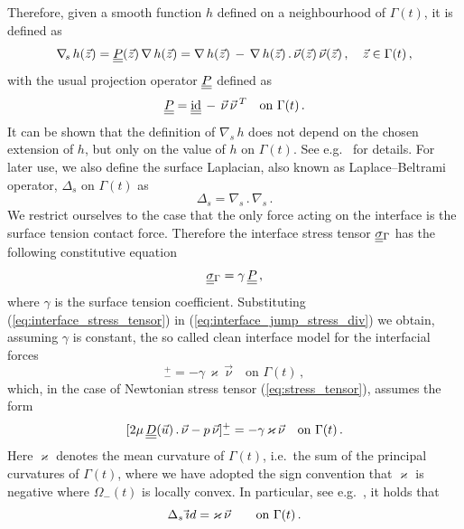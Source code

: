 \documentclass[a4paper,12pt,onecolumn]{article}
\newcommand{\nabs}{\nabla_{\!s}}
\newcommand{\id}{\rm id}
\newcommand{\mat}[1]{\underline{\underline{#1}}\rule{0pt}{0pt}}
\begin{document}
Therefore, given a smooth function $h$ defined on a neighbourhood of
$\Gamma(t)$, it is defined as
\begin{equation}\label{eq:surface_gradient}
\nabs\,h(\vec z)=\mat P(\vec z)\,\nabla\,h(\vec z)=\nabla\,h(\vec z)\,-
\,\nabla\,h(\vec z)\,.\,\vec\nu(\vec z)\,\vec\nu(\vec z)\,,\quad \vec z
\in\Gamma(t)\,,
\end{equation}
with the usual projection operator $\mat P$ defined as
\begin{equation}\label{eq:surface_projection}
\mat P=\mat\id\,-\,\vec\nu\,\vec\nu\,^T\quad \mbox{on } \Gamma(t)\,.
\end{equation}
It can be shown that the definition of $\nabs\,h$ does not depend on the chosen
extension of $h$, but only on the value of $h$ on $\Gamma(t)$. See e.g.\
\cite[\S2.1]{DeckelnickDE05} for details.
For later use, we also define the surface
Laplacian, also known as Laplace--Beltrami operator, $\Delta_s$ on $\Gamma(t)$
as
\begin{equation}\label{eq:surface_laplacian}
\Delta_s = \nabs\,.\,\nabs\,.
\end{equation}
We restrict ourselves to the case that the only force acting on the interface
is the surface tension contact force. Therefore the interface stress tensor
$\mat\sigma_\Gamma$ has the following constitutive equation
\begin{equation}\label{eq:interface_stress_tensor}
\mat\sigma_{\Gamma}=\gamma\,\mat P\,,
\end{equation}
where $\gamma$ is the surface tension coefficient. Substituting
(\ref{eq:interface_stress_tensor}) in (\ref{eq:interface_jump_stress_div}) we
obtain, assuming $\gamma$ is constant, the so called clean interface model for
the interfacial forces
\begin{equation}
[\mat\sigma\,\vec \nu]_-^+ = -\gamma\,\varkappa\,\vec\nu \quad \mbox{on }
\Gamma(t)\,,
\end{equation}
which, in the case of Newtonian stress tensor (\ref{eq:stress_tensor}), assumes
the form
\begin{equation}\label{eq:interface_jump_stress}
[2\mu \,\mat D(\vec u)\,.\,\vec\nu - p\,\vec \nu]_-^+
= -\gamma\,\varkappa\,\vec\nu \quad \mbox{on } \Gamma(t)\,.
\end{equation}
Here $\varkappa$ denotes the mean curvature of $\Gamma(t)$, i.e.\ the sum of
the principal curvatures of $\Gamma(t)$, where we have adopted the sign
convention that $\varkappa$ is negative where $\Omega_-(t)$ is locally convex.
In particular, see e.g.\ \cite{DeckelnickDE05}, it holds that
\begin{equation} \label{eq:LBop}
\Delta_s\, \vec \id = \varkappa\, \vec\nu \qquad \mbox{on $\Gamma(t)$}\,.
\end{equation}
\end{document}

